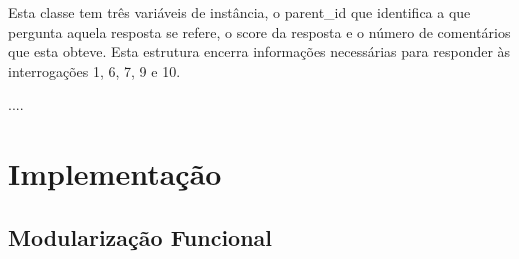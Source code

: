 \documentclass[a4paper]{article}
\begin{document}
Esta classe tem três variáveis de instância, o parent\_id que identifica a que
pergunta aquela resposta se refere, o score da resposta e o número de comentários
que esta obteve.
Esta estrutura encerra informações necessárias para responder às interrogações 1,
6, 7, 9 e 10.


....


\section{Implementação}
\label{sec:implementacao}

\subsection{Modularização Funcional}
\label{sec:organizacao}
\end{document}
